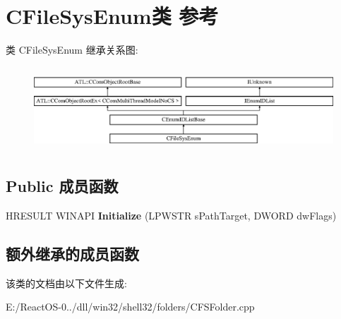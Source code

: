 \hypertarget{class_c_file_sys_enum}{}\section{C\+File\+Sys\+Enum类 参考}
\label{class_c_file_sys_enum}
类 C\+File\+Sys\+Enum 继承关系图\+:\begin{figure}[H]
\begin{center}
\leavevmode
\includegraphics[height=3.181818cm]{class_c_file_sys_enum}
\end{center}
\end{figure}
\subsection*{Public 成员函数}
\begin{DoxyCompactItemize}
\item 
\mbox{\label{class_c_file_sys_enum_aa97fd0402802e8b4bbaba5cf6be20490}} 
H\+R\+E\+S\+U\+LT W\+I\+N\+A\+PI {\bfseries Initialize} (L\+P\+W\+S\+TR s\+Path\+Target, D\+W\+O\+RD dw\+Flags)
\end{DoxyCompactItemize}
\subsection*{额外继承的成员函数}


该类的文档由以下文件生成\+:\begin{DoxyCompactItemize}
\item 
E\+:/\+React\+O\+S-\/0../dll/win32/shell32/folders/C\+F\+S\+Folder.\+cpp\end{DoxyCompactItemize}
